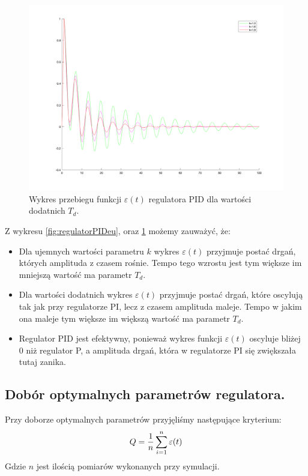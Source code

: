 \documentclass[a4paper,10pt]{article}
\begin{document}
\begin{figure}[!h]
    \centering
	\includegraphics[width=130mm]{PID-kd.png}
	\caption{Wykres przebiegu funkcji $\varepsilon(t)$ regulatora PID dla wartości dodatnich $T_{d}$.}
    \label{fig:regulatorPIDed}
\end{figure}
\newpage Z wykresu \ref{fig:regulatorPIDeu}, oraz \ref{fig:regulatorPIDed} możemy zauważyć, że:
\begin{itemize}
	\item Dla ujemnych wartości parametru $k$ wykres $\varepsilon(t)$ przyjmuje postać drgań, których amplituda z czasem rośnie. Tempo tego wzrostu jest tym większe im mniejszą wartość ma parametr $T_{d}$.
	\item Dla wartości dodatnich wykres $\varepsilon(t)$ przyjmuje postać drgań, które oscylują tak jak przy regulatorze PI, lecz z czasem amplituda maleje. Tempo w jakim ona maleje tym większe im większą wartość ma parametr $T_{d}$.
	\item Regulator PID jest efektywny, ponieważ wykres funkcji $\varepsilon(t)$ oscyluje bliżej 0 niż regulator P, a amplituda drgań, która w regulatorze PI się zwiększała tutaj zanika.
\end{itemize}

%
%
\subsection{Dobór optymalnych parametrów regulatora.}\label{sec:zad2}
Przy doborze optymalnych parametrów przyjęliśmy następujące kryterium:
\begin{equation} \label{eqn:transOS}
	Q = {1 \over n}\sum_{i=1}^{n} \varepsilon(t)
\end{equation}
Gdzie $n$ jest ilością pomiarów wykonanych przy symulacji.
\end{document}
